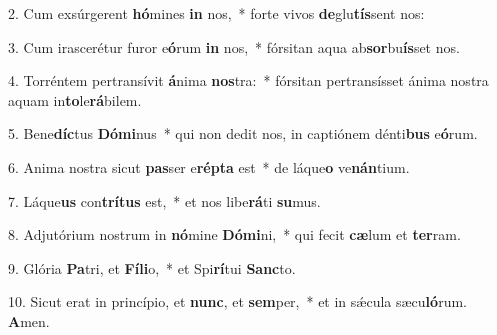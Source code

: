 2. Cum exsúrgerent \textbf{hó}mines \textbf{in} nos,~*  forte vivos \textbf{de}glu\textbf{tís}sent nos:\

3. Cum irascerétur furor e\textbf{ó}rum \textbf{in} nos,~*  fórsitan aqua ab\textbf{sor}bu\textbf{ís}set nos.\

4. Torréntem pertransívit \textbf{á}nima \textbf{nos}tra:~*  fórsitan pertransísset ánima nostra aquam in\textbf{to}le\textbf{rá}bilem.\

5. Bene\textbf{díc}tus \textbf{Dó}\textbf{mi}nus~*  qui non dedit nos, in captiónem dénti\textbf{bus} e\textbf{ó}rum.\

6. Anima nostra sicut \textbf{pas}ser e\textbf{rép}\textbf{ta} est~*  de láque\textbf{o} ve\textbf{nán}tium.\

7. Láque\textbf{us} con\textbf{trí}\textbf{tus} est,~*  et nos libe\textbf{rá}ti \textbf{su}mus.\

8. Adjutórium nostrum in \textbf{nó}mine \textbf{Dó}\textbf{mi}ni,~*  qui fecit \textbf{cæ}lum et \textbf{ter}ram.\

9. Glória \textbf{Pa}tri, et \textbf{Fí}\textbf{li}o,~*  et Spi\textbf{rí}tui \textbf{Sanc}to.\

10. Sicut erat in princípio, et \textbf{nunc}, et \textbf{sem}per,~*  et in sǽcula sæcu\textbf{ló}rum. \textbf{A}men.\

